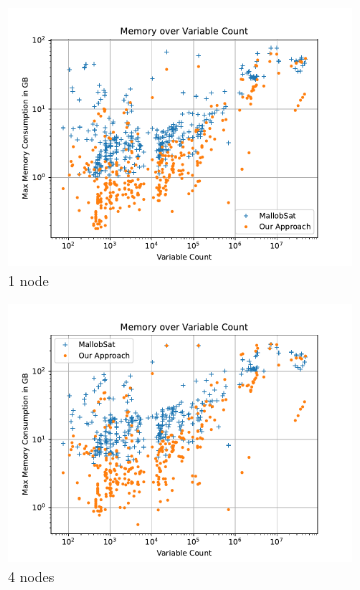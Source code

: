 \documentclass[12pt,a4paper,twoside]{scrartcl}
\numberwithin{equation}{section}
\begin{document}
\begin{figure}[!h]
  \center
  \begin{subfigure}[c]{.45\textwidth}
    \center
    \includegraphics[scale=.45]{plots/1node_compare/mem_abs_over_vars.pdf}
    \caption{1 node}
  \end{subfigure}
  \begin{subfigure}[c]{.45\textwidth}
    \center
    \includegraphics[scale=.45]{plots/4node_compare/mem_abs_over_vars.pdf}
    \caption{4 nodes}
  \end{subfigure}
  \begin{subfigure}[c]{.45\textwidth}
    \center

\end{subfigure}
\end{figure}
\end{document}
